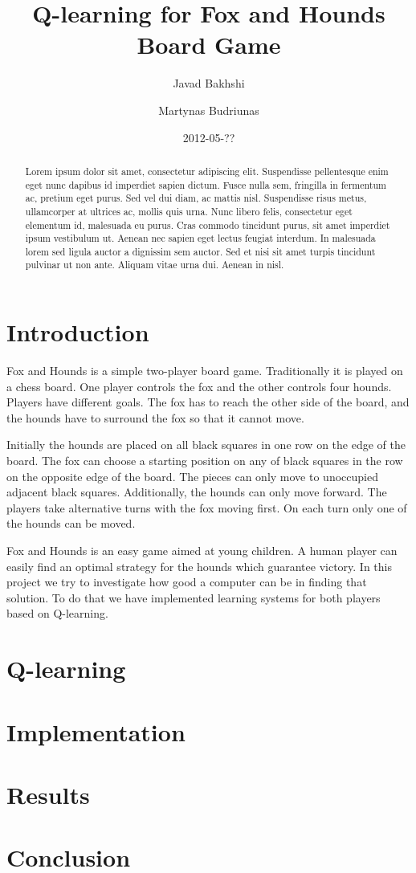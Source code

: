 \documentclass[a4paper]{report}
\title{Q-learning for Fox and Hounds Board Game}
\author{Javad Bakhshi \and Martynas Budriunas}
\date{2012-05-??}
\begin{document}
\maketitle

\begin{abstract}
Lorem ipsum dolor sit amet, consectetur adipiscing elit. Suspendisse
pellentesque enim eget nunc dapibus id imperdiet sapien dictum. Fusce nulla
sem, fringilla in fermentum ac, pretium eget purus. Sed vel dui diam, ac mattis
nisl. Suspendisse risus metus, ullamcorper at ultrices ac, mollis quis urna.
Nunc libero felis, consectetur eget elementum id, malesuada eu purus. Cras
commodo tincidunt purus, sit amet imperdiet ipsum vestibulum ut. Aenean nec
sapien eget lectus feugiat interdum. In malesuada lorem sed ligula auctor a
dignissim sem auctor. Sed et nisi sit amet turpis tincidunt pulvinar ut non
ante. Aliquam vitae urna dui. Aenean in nisl. 
\end{abstract}

\tableofcontents

\chapter{Introduction}
Fox and Hounds is a simple two-player board game. Traditionally it is played on
a chess board. One player controls the fox and the other controls four hounds.
Players have different goals. The fox has to reach the other side of the board,
and the hounds have to surround the fox so that it cannot move.

Initially the hounds are placed on all black squares in one row on the edge of
the board. The fox can choose a starting position on any of black squares in the
row on the opposite edge of the board. The pieces can only move to unoccupied
adjacent black squares. Additionally, the hounds can only move forward. The
players take alternative turns with the fox moving first. On each turn only one
of the hounds can be moved.

Fox and Hounds is an easy game aimed at young children. A human player can
easily find an optimal strategy for the hounds which guarantee victory. In this
project we try to investigate how good a computer can be in finding that
solution. To do that we have implemented learning systems for both players
based on Q-learning.

\chapter{Q-learning}

\chapter{Implementation}

\chapter{Results}

\chapter{Conclusion}

\begin{thebibliography}{9}
\end{thebibliography}
\end{document}

